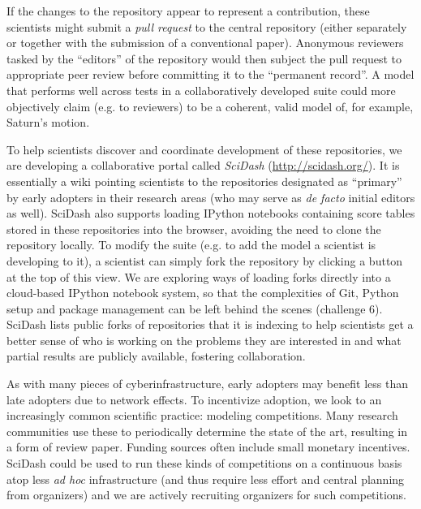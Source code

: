 \documentclass[9pt]{sig-alternate}
\begin{document}
If the changes to the repository appear to represent a contribution, these scientists might submit a \emph{pull request} to the central repository (either separately or together with the submission of a conventional paper). Anonymous reviewers tasked by the ``editors'' of the repository would then subject the pull request to appropriate peer review before committing it to the ``permanent record''. A model that performs well across tests in a collaboratively developed suite could more objectively claim (e.g. to reviewers) to be a coherent, valid model of, for example, Saturn's motion. 



To help scientists discover and coordinate development of these repositories, we are developing a collaborative portal called \textit{SciDash} (\url{http://scidash.org/}). It is essentially a wiki pointing scientists to the repositories designated as ``primary'' by early adopters in their research areas (who may serve as \emph{de facto} initial editors as well). SciDash also supports loading IPython notebooks containing score tables stored in these repositories into the browser, avoiding the need to clone the repository locally. To modify the suite (e.g. to add the model a scientist is developing to it), a scientist can simply fork the repository by clicking a button at the top of this view. We are exploring ways of loading forks directly into a cloud-based IPython notebook system, so that the complexities of Git, Python setup and package management can be left behind the scenes (challenge 6). SciDash lists public forks of repositories that it is indexing to help scientists get a better sense of who is working on the problems they are interested in and what partial results are publicly available, fostering collaboration.

As with many pieces of cyberinfrastructure, early adopters may benefit less than late adopters due to network effects. To incentivize adoption, we look to an increasingly common scientific practice: modeling competitions. Many research communities use these to periodically determine the state of the art, resulting in a form of review paper. Funding sources often include small monetary incentives.
   SciDash could be used to run these kinds of competitions on a continuous basis atop less \textit{ad hoc} infrastructure (and thus require less effort and central planning from organizers) and we are actively recruiting organizers for such competitions.
\end{document}
